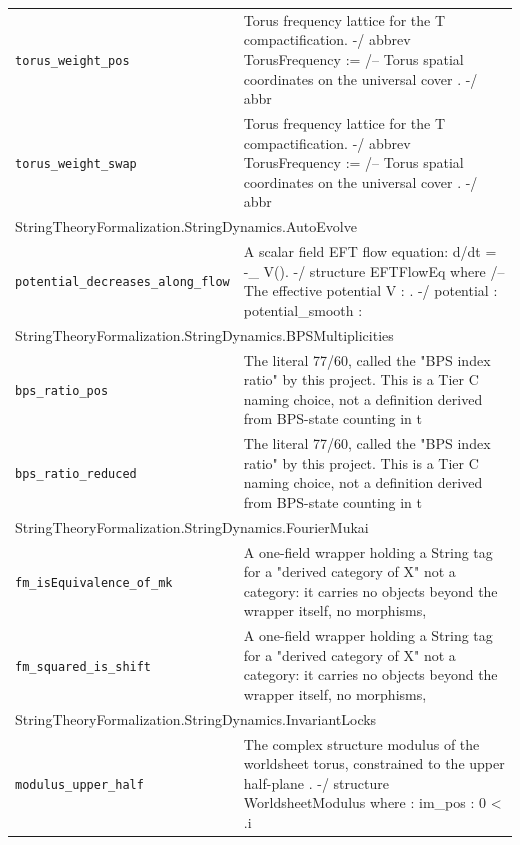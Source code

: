 \begin{longtable}{p{}p{}}
\quad\texttt{\footnotesize torus\_weight\_pos} & {\footnotesize Torus frequency lattice    for the T compactification. -/ abbrev TorusFrequency :=    /-- Torus spatial coordinates on the universal cover   . -/ abbr} \\
\quad\texttt{\footnotesize torus\_weight\_swap} & {\footnotesize Torus frequency lattice    for the T compactification. -/ abbrev TorusFrequency :=    /-- Torus spatial coordinates on the universal cover   . -/ abbr} \\
\multicolumn{2}{l}{\textsf{\small StringTheoryFormalization.StringDynamics.AutoEvolve}} \\
\quad\texttt{\footnotesize potential\_decreases\_along\_flow} & {\footnotesize A scalar field EFT flow equation: d/dt = -\_ V(). -/ structure EFTFlowEq where /-- The effective potential V :   . -/ potential :    potential\_smooth :} \\
\multicolumn{2}{l}{\textsf{\small StringTheoryFormalization.StringDynamics.BPSMultiplicities}} \\
\quad\texttt{\footnotesize bps\_ratio\_pos} & {\footnotesize The literal 77/60, called the "BPS index ratio" by this project. This is a Tier C naming choice, not a definition derived from BPS-state counting in t} \\
\quad\texttt{\footnotesize bps\_ratio\_reduced} & {\footnotesize The literal 77/60, called the "BPS index ratio" by this project. This is a Tier C naming choice, not a definition derived from BPS-state counting in t} \\
\multicolumn{2}{l}{\textsf{\small StringTheoryFormalization.StringDynamics.FourierMukai}} \\
\quad\texttt{\footnotesize fm\_isEquivalence\_of\_mk} & {\footnotesize A one-field wrapper holding a String tag for a "derived category of X"  not a category: it carries no objects beyond the wrapper itself, no morphisms,} \\
\quad\texttt{\footnotesize fm\_squared\_is\_shift} & {\footnotesize A one-field wrapper holding a String tag for a "derived category of X"  not a category: it carries no objects beyond the wrapper itself, no morphisms,} \\
\multicolumn{2}{l}{\textsf{\small StringTheoryFormalization.StringDynamics.InvariantLocks}} \\
\quad\texttt{\footnotesize modulus\_upper\_half} & {\footnotesize The complex structure modulus  of the worldsheet torus, constrained to the upper half-plane . -/ structure WorldsheetModulus where  :  im\_pos : 0 < .i} \\

\end{longtable}
